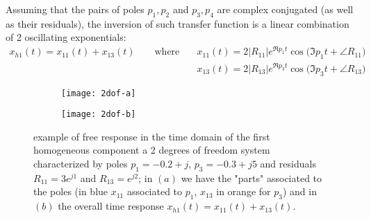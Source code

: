 	Assuming that the pairs of poles $p_1,p_2$ and $p_3,p_4$ are complex conjugated (as well as their residuals), the inversion of such transfer function is a linear combination of 2 oscillating exponentials:
	\begin{align*}
		x_{h1}(t) = x_{11}(t) + x_{13}(t) \qquad \textrm{where} \quad & x_{11}(t) = 2 |R_{11}| e^{\Re{p_1} t}\cos\big(\Im{p_1} t +\angle{R_{11}}\big) \\
		& x_{13}(t) = 2 |R_{13}| e^{\Re{p_3} t}\cos\big(\Im{p_3} t +\angle{R_{13}}\big)
	\end{align*}
	
	\begin{figure}[bht]
		\centering
		\begin{subfigure}{0.48\linewidth}
			\centering \texttt{[image: 2dof-a]} \caption{}
		\end{subfigure}
		\begin{subfigure}{0.48\linewidth}
			\centering \texttt{[image: 2dof-b]} \caption{}
		\end{subfigure}
		\caption{example of free response in the time domain of the first homogeneous component a 2 degrees of freedom system characterized by poles $p_1 = -0.2 + j$, $p_3 = -0.3 + j5$ and residuals $R_{11} = 3 e^{j1}$ and  $R_{13} = e^{j2}$; in $(a)$ we have the "parts" associated to the poles (in blue $x_{11}$ associated to $p_1$, $x_{13}$ in orange for $p_3$) and in $(b)$ the overall time response $x_{h1}(t) = x_{11}(t) + x_{13}(t)$.  }
	\end{figure}
	
	
